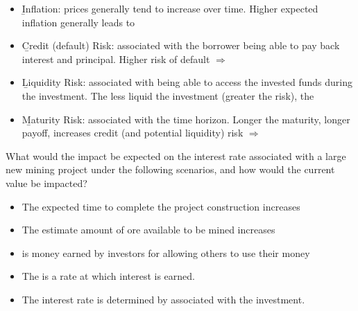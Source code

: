 \begin{itemize}
    \item \b{Inflation}: prices generally tend to increase over time. Higher expected inflation generally leads to 
    \item \b{Credit (default) Risk}: associated with the borrower being able to pay back interest and principal. Higher risk of default $\Rightarrow$ 
    \item \b{Liquidity Risk}: associated with being able to access the invested funds during the investment. The less liquid the investment (greater the risk), the 
    \item \b{Maturity Risk}: associated with the time horizon. Longer the maturity, longer payoff, increases credit (and potential liquidity) risk $\Rightarrow$ 
\end{itemize}

\begin{example}
    What would the impact be expected on the interest rate associated with a large new mining project under the following scenarios, and how would the current value be impacted?
    \begin{itemize}
        \item The expected time to complete the project construction increases
        \\
        \item The estimate amount of ore available to be mined increases
        \\
    \end{itemize}
\end{example}

\begin{itemize}
    \item {} is money earned by investors for allowing others to use their money
    \item The  is a rate at which interest is earned.
    \item The interest rate is determined by  associated with the investment.
\end{itemize}





